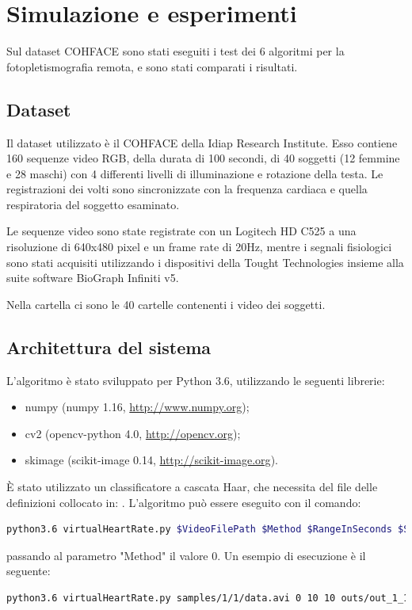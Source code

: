 \documentclass[journal,A4paper,compsoc,epsfig]{IEEEtran}
\begin{document}
  \section{Simulazione e esperimenti}
    \label{sec:Simulazione}
    Sul dataset COHFACE sono stati eseguiti i test dei 6 algoritmi per la fotopletismografia remota, e sono stati comparati i risultati.

    \subsection{Dataset}
      \label{dataset}
      Il dataset utilizzato è il COHFACE della Idiap Research Institute.
      Esso contiene 160 sequenze video RGB, della durata di 100 secondi, di 40 soggetti (12 femmine e 28 maschi) con 4 differenti livelli di illuminazione e rotazione della testa. Le registrazioni dei volti sono sincronizzate con la frequenza cardiaca e quella respiratoria del soggetto esaminato.
      
      Le sequenze video sono state registrate con un Logitech HD C525 a una risoluzione di 640x480 pixel e un frame rate di 20Hz, mentre i segnali fisiologici sono stati acquisiti utilizzando i dispositivi della Tought Technologies insieme alla suite software BioGraph Infiniti v5.
      
      Nella cartella  ci sono le 40 cartelle contenenti i video dei soggetti.

    \subsection{Architettura del sistema}
      \label{arch}
      L'algoritmo è stato sviluppato per Python 3.6, utilizzando le seguenti librerie:
      \begin{itemize}
        \item numpy (numpy 1.16, \url{http://www.numpy.org});
        \item cv2 (opencv-python 4.0, \url{http://opencv.org});
        \item skimage (scikit-image 0.14, \url{http://scikit-image.org}).
      \end{itemize}      
      È stato utilizzato un classificatore a cascata Haar, che necessita del file delle definizioni collocato in: .      
      L'algoritmo può essere eseguito con il comando:
      \begin{lstlisting}[language=bash,breaklines=true]
        python3.6 virtualHeartRate.py $VideoFilePath $Method $RangeInSeconds $StepsInSeconds $OutFilePath $ShowVideo
      \end{lstlisting}
      passando al parametro "Method" il valore 0.
      Un esempio di esecuzione è il seguente:
      \begin{lstlisting}[language=bash,breaklines=true]
        python3.6 virtualHeartRate.py samples/1/1/data.avi 0 10 10 outs/out_1_1.txt 0
      \end{lstlisting}
\end{document}
